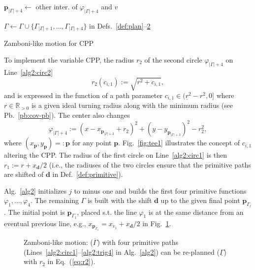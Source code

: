 \documentclass[letterpaper,10pt,journal,twoside]{IEEEtran}
\newcommand{\figpath}{./figures}
\theoremstyle{definition}
\begin{document}
\begin{algorithm}[t]
\begin{algorithmic}[1]
          \STATE $\mathbf{p}_{|\Gamma|+4}\gets$ other inter. %
          of $\varphi_{|\Gamma|+4}$ and $v$\vspace*{.3ex}\label{alg2:trig4}

          \vspace*{.8ex}
          \STATE $\Gamma\gets\Gamma\cup\{\Gamma_{|\Gamma|+1},\dots,\Gamma_{|\Gamma|+4}\}${ in Defs.~\ref{def:plan}--\hyperref[def:stage]{2}}\label{alg2:last}

        \ENDIF
      \ENDIF
    \ENDFOR
  \end{algorithmic}
  \caption{Zamboni-like motion for CPP}\label{alg2}
\end{algorithm}

To implement the variable CPP, the radius $r_2$ of the second circle $\varphi_{|\Gamma|+4}$ on Line~\ref{alg2:circ2}
\begin{equation}\label{eq:r2}
  r_2(c_{i,1}):=\sqrt{r^2+c_{i,1}},
\end{equation}
and is expressed in the function of a path parameter $c_{i,1}\in(\underline{r}^2-r^2,0]$ where $r\in\mathbb{R}_{>0}$ is a given ideal turning radius along with the minimum radius (see Pb.~\ref{pb:cov-pb}). The center also changes
\begin{equation}\label{eq:second-circ-gene}
  \varphi_{|\Gamma|+4}:=(x-x_{\mathbf{p}_{|\Gamma|+3}}+r_2)^2+(y-y_{\mathbf{p}_{|\Gamma|+3}})^2-r_2^2,
\end{equation}
where $(x_\mathbf{p},y_\mathbf{p})=:\mathbf{p}$ for any point $\mathbf{p}$. Fig.~\ref{fig:tee1} illustrates the concept of $c_{i,1}$ altering the CPP. The radius of the first circle on Line~\ref{alg2:circ1} is then $r_1:=r+x_\mathbf{d}/2$ (i.e., the radiuses of the two circles ensure that the primitive paths are shifted of $\mathbf{d}$ in Def.~\ref{def:primitive}).

Alg.~\ref{alg2} initializes $j$ to minus one and builds the first four primitive functions $\varphi_1,\dots,\varphi_4$. The remaining $\Gamma$ is built with the shift $\mathbf{d}$ up to the given final point $\mathbf{p}_{\Gamma_l}$. The initial point is $\mathbf{p}_{\Gamma_1}$, placed s.t. the line $\varphi_1$ is at the same distance from an eventual previous line, e.g., $x_{\mathbf{p}_{\Gamma_1}}=x_{v_1}+x_{\mathbf{d}}/2$ in Fig.~\ref{fig:zambo}.

\begin{figure}[t]
  \footnotesize
  \begin{minipage}[l]{0.73\columnwidth}
    \centering
    \vspace*{-2ex}
    
  \end{minipage}\hfill
  \begin{minipage}[l]{0.25\columnwidth}
    \caption{Zamboni-like motion: ($\overline{\Gamma}$) with four primitive paths (Lines~\ref{alg2:circ1}--\ref{alg2:trig4} in Alg.~\ref{alg2}) can be re-planned ($\underline{\Gamma}$) with $r_2$ in Eq.~(\ref{eq:r2}).}
    \label{fig:zambo}
  \end{minipage}
  \vspace*{-4.5ex}
\end{figure}
\end{document}
